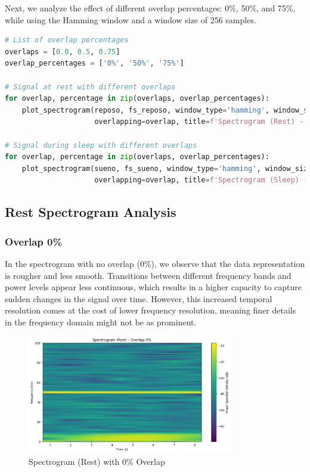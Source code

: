 \documentclass[10pt]{article}
\theoremstyle{definition}
\theoremstyle{remark}
\theoremstyle{definition}
\numberwithin{equation}{prob}
\begin{document}
Next, we analyze the effect of different overlap percentages: 0\%, 50\%, and 75\%, while using the Hamming window and a window size of 256 samples.



\begin{lstlisting}[language=Python]
# List of overlap percentages
overlaps = [0.0, 0.5, 0.75]
overlap_percentages = ['0%', '50%', '75%']

# Signal at rest with different overlaps
for overlap, percentage in zip(overlaps, overlap_percentages):
    plot_spectrogram(reposo, fs_reposo, window_type='hamming', window_size=256,
                     overlapping=overlap, title=f'Spectrogram (Rest) - Overlap {percentage}')

# Signal during sleep with different overlaps
for overlap, percentage in zip(overlaps, overlap_percentages):
    plot_spectrogram(sueno, fs_sueno, window_type='hamming', window_size=256,
                     overlapping=overlap, title=f'Spectrogram (Sleep) - Overlap {percentage}')
\end{lstlisting}

\subsection{Rest Spectrogram Analysis}

\subsubsection{Overlap 0\%}
In the spectrogram with no overlap (0\%), we observe that the data representation is rougher and less smooth. Transitions between different frequency bands and power levels appear less continuous, which results in a higher capacity to capture sudden changes in the signal over time. However, this increased temporal resolution comes at the cost of lower frequency resolution, meaning finer details in the frequency domain might not be as prominent.

\begin{figure}[H]
    \centering
    \includegraphics[width=0.8\textwidth]{./figures/Spectrogram (Rest) - Overlap 0.png}
    \caption{Spectrogram (Rest) with 0\% Overlap}
    \label{fig:rest_0_overlap}
\end{figure}
\end{document}
